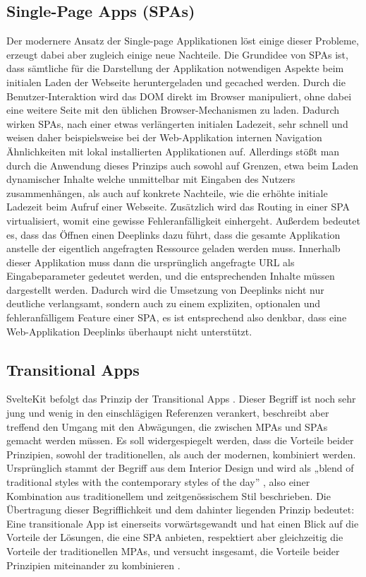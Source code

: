 \subsection{Single-Page Apps (SPAs)}
Der modernere Ansatz der Single-page Applikationen löst einige dieser Probleme, erzeugt dabei aber zugleich einige neue Nachteile. Die Grundidee von SPAs ist, dass sämtliche für die Darstellung der Applikation notwendigen Aspekte beim initialen Laden der Webseite heruntergeladen und gecached werden. Durch die Benutzer-Interaktion wird das DOM direkt im Browser manipuliert, ohne dabei eine weitere Seite mit den üblichen Browser-Mechanismen zu laden. Dadurch wirken SPAs, nach einer etwas verlängerten initialen Ladezeit, sehr schnell und weisen daher beispielsweise bei der Web-Applikation internen Navigation Ähnlichkeiten mit lokal installierten Applikationen auf. Allerdings stößt man durch die Anwendung dieses Prinzips auch sowohl auf Grenzen, etwa beim Laden dynamischer Inhalte welche unmittelbar mit Eingaben des Nutzers zusammenhängen, als auch auf konkrete Nachteile, wie die erhöhte initiale Ladezeit beim Aufruf einer Webseite. Zusätzlich wird das Routing in einer SPA virtualisiert, womit eine gewisse Fehleranfälligkeit einhergeht. Außerdem bedeutet es, dass das Öffnen einen Deeplinks dazu führt, dass die gesamte Applikation anstelle der eigentlich angefragten Ressource geladen werden muss. Innerhalb dieser Applikation muss dann die ursprünglich angefragte URL als Eingabeparameter gedeutet werden, und die entsprechenden Inhalte müssen dargestellt werden. Dadurch wird die Umsetzung von Deeplinks nicht nur deutliche verlangsamt, sondern auch zu einem expliziten, optionalen und fehleranfälligem Feature einer SPA, es ist entsprechend also denkbar, dass eine Web-Applikation Deeplinks überhaupt nicht unterstützt.
\subsection{Transitional Apps}
SvelteKit befolgt das Prinzip der Transitional Apps \cite[vgl.][]{Harris2021}. Dieser Begriff ist noch sehr jung und wenig in den einschlägigen Referenzen verankert, beschreibt aber treffend den Umgang mit den Abwägungen, die zwischen MPAs und SPAs gemacht werden müssen. Es soll widergespiegelt werden, dass die Vorteile beider Prinzipien, sowohl der traditionellen, als auch der modernen, kombiniert werden. Ursprünglich stammt der Begriff aus dem Interior Design und wird als „blend of traditional styles with the contemporary styles of the day” \cite{Wearstler2022}, also einer Kombination aus traditionellem und zeitgenössischem Stil beschrieben. Die Übertragung dieser Begrifflichkeit und dem dahinter liegenden Prinzip bedeutet: Eine transitionale App ist einerseits vorwärtsgewandt und hat einen Blick auf die Vorteile der Lösungen, die eine SPA anbieten, respektiert aber gleichzeitig die Vorteile der traditionellen MPAs, und versucht insgesamt, die Vorteile beider Prinzipien miteinander zu kombinieren \cite[vgl.][]{Harris2021}. 
